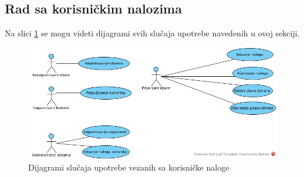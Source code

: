 \subsection{Rad sa korisničkim nalozima}

Na slici \ref{fig:UCUserAccounts} se mogu videti dijagrami svih slučaja upotrebe navedenih u ovoj sekciji.

\begin{figure}[H]
\begin{center}
\includegraphics[width=\textwidth]{Pictures/uc_user_accounts.png}
\end{center}
    \caption{Dijagrami slučaja upotrebe vezanih sa korisničke naloge}
\label{fig:UCUserAccounts}
\end{figure}









